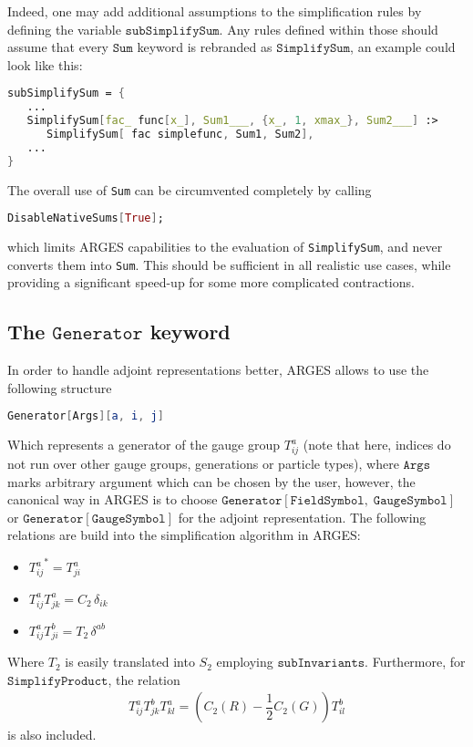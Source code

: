 \documentclass{scrartcl}
\begin{document}
Indeed, one may add additional assumptions to the simplification rules by defining the variable $\mathtt{subSimplifySum}$. Any rules defined within those should assume that every $\mathtt{Sum}$ keyword is rebranded as $\mathtt{SimplifySum}$, an example could look like this:
\begin{lstlisting}[language=mathematica,mathescape,columns=flexible,backgroundcolor=\color{light-gray}]
subSimplifySum = {
   ...
   SimplifySum[fac_ func[x_], Sum1___, {x_, 1, xmax_}, Sum2___] :> 
      SimplifySum[ fac simplefunc, Sum1, Sum2],
   ...
}
\end{lstlisting}
The overall use of \texttt{Sum} can be circumvented completely by calling
\begin{lstlisting}[language=mathematica,mathescape,columns=flexible,backgroundcolor=\color{light-gray}]
DisableNativeSums[True];
\end{lstlisting}
which limits ARGES capabilities to the evaluation of \texttt{SimplifySum}, and never converts them into \texttt{Sum}. This should be sufficient in all realistic use cases, while providing a significant speed-up for some more complicated contractions. 
\subsection{The $\mathtt{Generator}$ keyword}
In order to handle adjoint representations better, ARGES allows to use the following structure
\begin{lstlisting}[language=mathematica,mathescape,columns=flexible,backgroundcolor=\color{light-gray}]
Generator[Args][a, i, j]
\end{lstlisting}
Which represents a generator of the gauge group $T^a_{ij}$ (note that here, indices do not run over other gauge groups, generations or particle types), where $\mathtt{Args}$ marks arbitrary argument which can be chosen by the user, however, the canonical way in ARGES is to choose $\mathtt{Generator}[\mathtt{FieldSymbol},\;\mathtt{GaugeSymbol}]$ or $\mathtt{Generator}[\mathtt{GaugeSymbol}]$ for the adjoint representation.
The following relations are build into the simplification algorithm in ARGES:
\begin{itemize}
\item ${T^a_{ij}}^* = T^a_{ji}$
\item $T^a_{ij} T^a_{jk} = C_2\, \delta_{ik}$
\item $T^a_{ij} T^b_{ji} = T_2\, \delta^{ab}$
\end{itemize}
Where $T_2$ is easily translated into $S_2$ employing $\mathtt{subInvariants}$. Furthermore, for $\mathtt{SimplifyProduct}$, the relation
\begin{align*}
T^a_{ij} T^b_{jk} T^a_{kl} = \left(C_2(R) - \dfrac{1}{2} C_2(G)\right) T^b_{il}
\end{align*}
is also included.
\newpage
\end{document}
